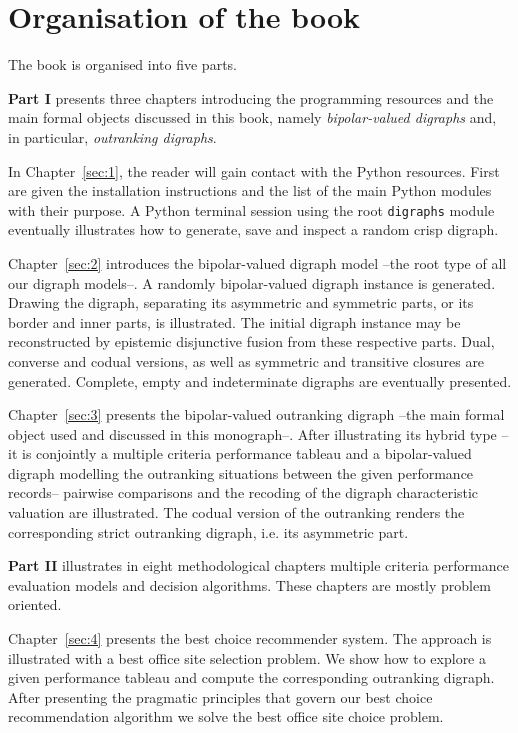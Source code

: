 \section*{Organisation of the book}
\label{sec:0.2}

The book is organised into five parts.
\vspace{0.5cm}

\textbf{Part I} presents three chapters introducing the \Digraph programming resources and the main formal objects discussed in this book, namely \emph{bipolar-valued digraphs} and, in particular, \emph{outranking digraphs}.

In Chapter~\ref{sec:1}, the reader will gain contact with the \Digraph Python resources. First are given the installation instructions and the list of the main \Digraph Python modules with their purpose. A Python terminal session using the root \texttt{digraphs} module eventually illustrates how to generate, save and inspect a random crisp digraph.

Chapter~\ref{sec:2} introduces the bipolar-valued digraph model --the root type of all our digraph models--. A randomly bipolar-valued digraph instance is generated. Drawing the digraph, separating its asymmetric and symmetric parts, or its border and inner parts, is illustrated. The initial digraph instance may be reconstructed by epistemic disjunctive fusion from these respective parts. Dual, converse and codual versions, as well as symmetric and transitive closures are generated. Complete, empty and indeterminate digraphs are eventually presented.

Chapter~\ref{sec:3} presents the bipolar-valued outranking digraph --the main formal object used and discussed in this monograph--. After illustrating its hybrid type --it is conjointly a multiple criteria performance tableau and a bipolar-valued digraph modelling the outranking situations between the given performance records-- pairwise comparisons and the recoding of the digraph characteristic valuation are illustrated. The codual version of the outranking renders the corresponding strict outranking digraph, i.e. its asymmetric part. 
\vspace{0.5cm}

\textbf{Part II} illustrates in eight methodological chapters multiple criteria performance evaluation models and decision algorithms. These chapters are mostly problem oriented.

Chapter~\vref{sec:4} presents the \Rubis best choice recommender system. The approach is illustrated with a best office site selection problem. We show how to explore a given performance tableau and compute the corresponding outranking digraph. After presenting the pragmatic principles that govern our best choice recommendation algorithm we solve the best office site choice problem.


